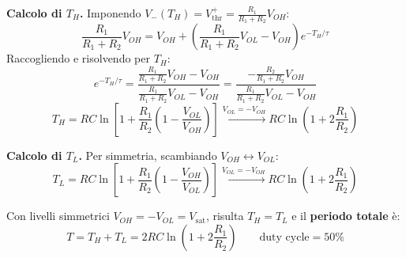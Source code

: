 \textbf{Calcolo di $T_H$.} Imponendo $V_-(T_H) = V_{\text{thr}}^+ = \frac{R_1}{R_1+R_2} V_{OH}$:
\[
    \frac{R_1}{R_1+R_2} V_{OH} = V_{OH} + \left(\frac{R_1}{R_1+R_2} V_{OL} - V_{OH}\right) e^{-T_H/\tau}
\]
Raccogliendo e risolvendo per $T_H$:
\[
    e^{-T_H/\tau} = \frac{\frac{R_1}{R_1+R_2} V_{OH} - V_{OH}}{\frac{R_1}{R_1+R_2} V_{OL} - V_{OH}}
    = \frac{-\frac{R_2}{R_1+R_2} V_{OH}}{\frac{R_1}{R_1+R_2} V_{OL} - V_{OH}}
\]
\[
    \boxed{T_H = RC \ln \left[ 1 + \frac{R_1}{R_2} \left( 1 - \frac{V_{OL}}{V_{OH}} \right) \right]}
    \xrightarrow{V_{OL} = -V_{OH}} RC \ln\!\left(1 + 2\frac{R_1}{R_2}\right)
\]

\textbf{Calcolo di $T_L$.} Per simmetria, scambiando $V_{OH} \leftrightarrow V_{OL}$:
\[
    \boxed{T_L = RC \ln \left[ 1 + \frac{R_1}{R_2} \left( 1 - \frac{V_{OH}}{V_{OL}} \right) \right]}
    \xrightarrow{V_{OL} = -V_{OH}} RC \ln\!\left(1 + 2\frac{R_1}{R_2}\right)
\]

Con livelli simmetrici $V_{OH} = -V_{OL} = V_{\text{sat}}$, risulta $T_H = T_L$ e il \textbf{periodo totale} è:
\[
    T = T_H + T_L = 2RC\ln\!\left(1 + 2\frac{R_1}{R_2}\right)
    \qquad \text{duty cycle} = 50\%
\]

